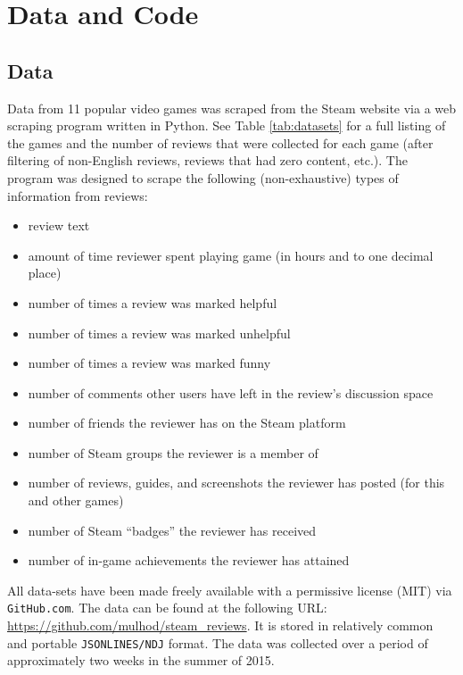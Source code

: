 \documentclass[9pt]{article}
\begin{document}
\section{Data and Code}

\subsection{Data}

Data from 11 popular video games was scraped from the Steam website via a web scraping program written in Python. See Table \ref{tab:datasets} for a full listing of the games and the number of reviews that were collected for each game (after filtering of non-English reviews, reviews that had zero content, etc.). The program was designed to scrape the following (non-exhaustive) types of information from reviews:

\begin{itemize}
\item review text
\item amount of time reviewer spent playing game (in hours and to one decimal place)
\item number of times a review was marked helpful
\item number of times a review was marked unhelpful
\item number of times a review was marked funny
\item number of comments other users have left in the review's discussion space
\item number of friends the reviewer has on the Steam platform
\item number of Steam groups the reviewer is a member of
\item number of reviews, guides, and screenshots the reviewer has posted (for this and other games)
\item number of Steam ``badges'' the reviewer has received
\item number of in-game achievements the reviewer has attained
\end{itemize}

All data-sets have been made freely available with a permissive license (MIT) via {\tt GitHub.com}. The data can be found at the following URL: \url{https://github.com/mulhod/steam_reviews}. It is stored in relatively common and portable {\tt JSONLINES/NDJ} format. The data was collected over a period of approximately two weeks in the summer of 2015.
\end{document}
